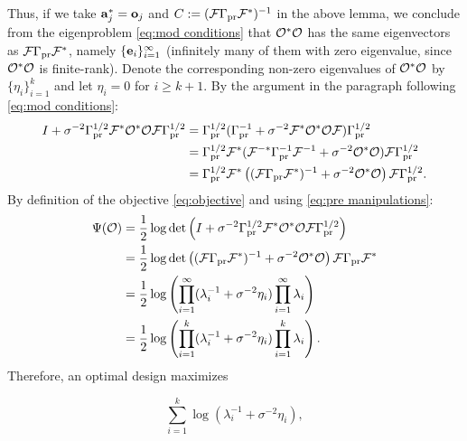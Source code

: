 \documentclass{amsart}
\numberwithin{equation}{section}
\begin{document}
Thus, if we take $\mathbf{a}_j^{*} = \mathbf{o}_j$ and $C := (\mathcal{F} \Gamma_{\textup{pr}}
\mathcal{F}^*)^{-1}$ in the above lemma, we conclude from the eigenproblem
\eqref{eq:mod conditions} that $\mathcal{O}^*\mathcal{O}$ has the same eigenvectors
as $\mathcal{F} \Gamma_{\textup{pr}} \mathcal{F}^*$, namely $\{\mathbf{e}_i\}_{i=1}^{\infty}$ (infinitely
many of them with zero eigenvalue, since $\mathcal{O}^*\mathcal{O}$ is
finite-rank). Denote the corresponding non-zero eigenvalues of
$\mathcal{O}^*\mathcal{O}$ by $\{\eta_i\}_{i=1}^{k}$ and let $\eta_i = 0$ for $i
\geq k+1$. By the argument in the paragraph following \eqref{eq:mod
  conditions}:
\begin{align}\label{eq:pre manipulations}
  \begin{split}
    I + \sigma^{-2} \Gamma_{\textup{pr}}^{1/2}  \mathcal{F} ^* \mathcal{O}^* \mathcal{O} \mathcal{F} \Gamma_{\textup{pr}}^{1/2} &= 
    \Gamma_{\textup{pr}}^{1/2} ( \Gamma_{\textup{pr}}^{-1} + \sigma^{-2} \mathcal{F}^*\mathcal{O}^*  \mathcal{O} \mathcal{F} ) \Gamma_{\textup{pr}}^{1/2}\\
    &=\Gamma_{\textup{pr}}^{1/2} \mathcal{F}^* ( \mathcal{F}^{-*} \Gamma_{\textup{pr}}^{-1}\mathcal{F}^{-1} + \sigma^{-2} \mathcal{O}^* \mathcal{O}  ) \mathcal{F} \Gamma_{\textup{pr}}^{1/2}\\
    &= \Gamma_{\textup{pr}}^{1/2} \mathcal{F}^* \left ( (\mathcal{F} \Gamma_{\textup{pr}} \mathcal{F}^* )^{-1} +\sigma^{-2} \mathcal{O}^* \mathcal{O}  \right ) \mathcal{F} \Gamma_{\textup{pr}}^{1/2}.
  \end{split}
\end{align}
By definition of the objective \eqref{eq:objective} and using
\eqref{eq:pre manipulations}:
\begin{align}\label{eq:mod objective}
  \begin{split}
    \Psi ( \mathcal{O} ) &=\frac12 \log \det \left( I + \sigma^{-2}
    \Gamma_{\textup{pr}}^{1/2} \mathcal{F} ^* \mathcal{O}^* \mathcal{O} \mathcal{F} \Gamma_{\textup{pr}}^{1/2} \right )\\
    &=\frac12 \log \det
    \left ( (\mathcal{F} \Gamma_{\textup{pr}} \mathcal{F}^* )^{-1} + \sigma^{-2}\mathcal{O}^* \mathcal{O}  \right ) \mathcal{F} \Gamma_{\textup{pr}} \mathcal{F}^* \\ 
    &=\frac12 \log \left (\prod_{i=1}^{\infty} ( \lambda_i^{-1} + \sigma^{-2} \eta_i ) \prod_{i=1}^{\infty} \lambda_i \right ) \\
    &=\frac12 \log \left ( \prod_{i=1}^{k} ( \lambda_i^{-1} + \sigma^{-2} \eta_i )\prod_{i=1}^{k} \lambda_i \right ). 
  \end{split}
\end{align}
Therefore, an optimal design maximizes

\begin{equation}\label{eq:true target}
  \sum_{i=1}^{k}\log (\lambda_i^{-1} + \sigma^{-2} \eta_i),
\end{equation}
\end{document}
